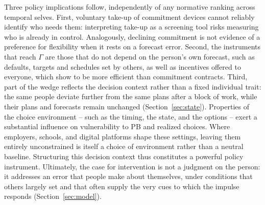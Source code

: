 \documentclass[11pt,a4paper]{article}
\theoremstyle{plain}
\theoremstyle{definition}
\begin{document}
Three policy implications follow, independently of any normative ranking across temporal selves. 
First, voluntary take-up of commitment devices cannot reliably identify who needs them: interpreting take-up as a screening tool risks measuring who is already in control. Analogously, declining commitment is not evidence of a preference for flexibility when it rests on a forecast error. 
Second, the instruments that reach $\Gamma$ are those that do not depend on the person's own forecast, such as defaults, targets and schedules set by others, as well as incentives offered to everyone, which \citet{carrera2022} show to be more efficient than commitment contracts. %
Third, part of the wedge reflects the decision context rather than a fixed individual trait: the same people deviate further from the same plans after a block of work, while their plans and forecasts remain unchanged (Section~\ref{sec:state}). 
Properties of the choice environment -- such as the timing, the state, and the options -- %
exert a substantial influence on vulnerability to PB and realized choices. Where employers, schools, and digital platforms shape these settings, leaving them entirely unconstrained is itself a choice of environment rather than a neutral baseline. %
Structuring this decision context thus constitutes a powerful policy instrument.
Ultimately, the case for intervention is not a judgment on the person: it addresses an error that people make about themselves, under conditions that others largely set and that often supply the very cues to which the impulse responds (Section~\ref{sec:model}). 



\end{document}
